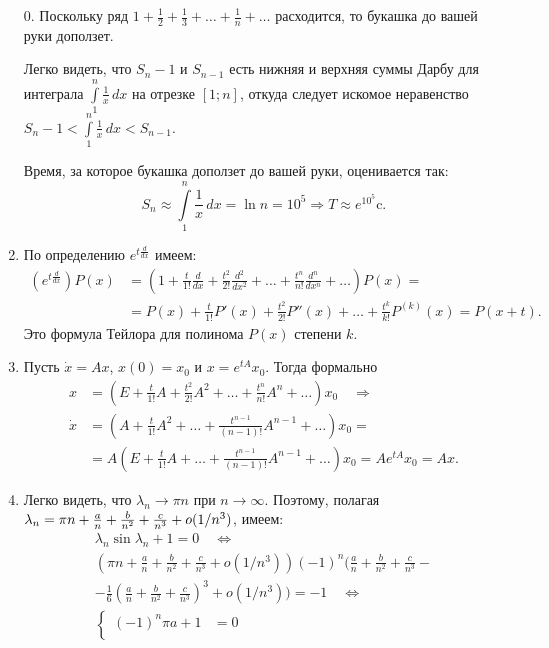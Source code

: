 \documentclass[a4paper]{article}
\newcommand*{\p}[1]{#1\nobreak\discretionary{}{\hbox{$\mathsurround=0pt #1$}}{}}
\begin{document}
\begin{enumerate}
  \item[0.] Поскольку ряд
  $1+\frac{1}{2}+\frac{1}{3}+\ldots+\frac{1}{n}+\ldots$ расходится,
  то букашка до вашей руки доползет.

  Легко видеть, что $S_{n}-1$ и $S_{n-1}$ есть нижняя и верхняя
  суммы Дарбу для интеграла
  $\int\limits_1^n\!\frac{1}{x}\,dx$ на отрезке $[1;n]$,
  откуда следует искомое неравенство $S_n-1<\int\limits_1^n\!\frac{1}{x}\,dx
  <S_{n-1}$.

  Время, за которое букашка доползет до вашей руки, оценивается так:
  $$S_{n}\approx \int\limits_1^{n}\!\frac{1}{x}\,dx=\ln n=10^5\Rightarrow
  T\approx e^{10^5} \mathrm{\text{c}}.$$
  \item По определению $e^{t\frac{d}{dx}}$ имеем:
  \begin{align*}
  (e^{t\frac{d}{dx}})P(x)&=(1+\frac{t}{1!}\frac{d}{dx}+\frac{t^2}{2!}\frac{d^2}{dx^2}+\ldots+
  \frac{t^n}{n!}\frac{d^n}{dx^n}+\ldots)P(x)=\\
  &=P(x)+\frac{t}{1!}P'(x)+\frac{t^2}{2!}P''(x)+\ldots+\frac{t^k}{k!}P^{(k)}(x)=P(x+t).
  \end{align*}
  Это формула Тейлора для полинома $P(x)$ степени $k$.
  \item Пусть $\dot{x}=Ax$, $x(0)=x_0$ и $x=e^{tA}x_0$. Тогда
  формально
  \begin{align*}
  x&=(E+\frac{t}{1!}A+\frac{t^2}{2!}A^2+\ldots+\frac{t^n}{n!}A^n+\ldots)x_0\quad\Rightarrow\\
  \dot{x}&=(A+\frac{t}{1!}A^2+\ldots+\frac{t^{n-1}}{(n-1)!}A^{n-1}+\ldots)x_0=\\
  &=A(E+\frac{t}{1!}A+\ldots+\frac{t^{n-1}}{(n-1)!}A^{n-1}+\ldots)x_0=Ae^{tA}x_0=Ax.
  \end{align*}
  \item Легко видеть, что $\lambda_n\rightarrow \pi n$ при
  $n\rightarrow\infty$. Поэтому, полагая $\lambda_n\p=\pi n+\frac{a}{n}+\frac{b}{n^2}+
  \frac{c}{n^3}+o(1/n^3)$, имеем:
  \begin{gather*}
  \lambda_n \sin\lambda_n+1=0\quad\Leftrightarrow\\
  \left(\pi n+\frac{a}{n}+\frac{b}{n^2}+\frac{c}{n^3}+o(1/n^3)\right)
  (-1)^n\Bigg(\frac{a}{n}+\frac{b}{n^2}+\frac{c}{n^3}-\\
  -\frac{1}{6}\left(\frac{a}{n}+\frac{b}{n^2}+\frac{c}{n^3}\right)^3+o(1/n^3)\Bigg)=-1\quad\Leftrightarrow\\
  \left\{
  \begin{aligned}
  (-1)^n \pi a +1&= 0\\

\end{aligned}
\end{gather*}
\end{enumerate}
\end{document}
